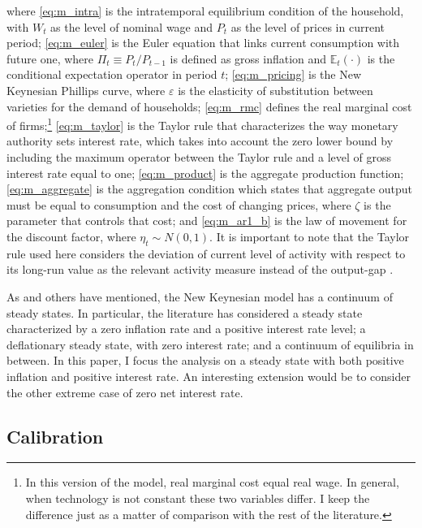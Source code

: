 \documentclass[12pt]{article}
\numberwithin{equation}{section}
\begin{document}
where \eqref{eq:m_intra} is the intratemporal equilibrium condition of the household, with $W_t$ as the level of nominal wage and $P_t$ as the level of prices in current period; \eqref{eq:m_euler} is the Euler equation that links current consumption with future one, where $\Pi_t\equiv P_t/P_{t-1}$ is defined as gross inflation and $\mathbb{E}_t(\cdot)$ is the conditional expectation operator in period $t$; \eqref{eq:m_pricing} is the New Keynesian Phillips curve, where $\varepsilon$ is the elasticity of substitution between varieties for the demand of households; \eqref{eq:m_rmc} defines the real marginal cost of firms;\footnote{In this version of the model, real marginal cost equal real wage. In general, when technology is not constant these two variables differ. I keep the difference just as a matter of comparison with the rest of the literature.} \eqref{eq:m_taylor} is the Taylor rule that characterizes the way monetary authority sets interest rate, which takes into account the zero lower bound by including the maximum operator between the Taylor rule and a level of gross interest rate equal to one; \eqref{eq:m_product} is the aggregate production function; \eqref{eq:m_aggregate} is the aggregation condition which states that aggregate output must be equal to consumption and the cost of changing prices, where $\zeta$ is the parameter that controls that cost; and \eqref{eq:m_ar1_b} is the law of movement for the discount factor, where $\eta_t\sim N(0,1)$. It is important to note that the Taylor rule used here considers the deviation of current level of activity with respect to its long-run value as the relevant activity measure instead of the output-gap \citep{Gali2015}.

As \cite{BenhabibEtAl2001a} and others have mentioned, the New Keynesian model has a continuum of steady states. In particular, the literature has considered a steady state characterized by a zero inflation rate and a positive interest rate level; a deflationary steady state, with zero interest rate; and a continuum of equilibria in between. In this paper, I focus the analysis on a steady state with both positive inflation and positive interest rate. An interesting extension would be to consider the other extreme case of zero net interest rate.

\subsection{Calibration}
\end{document}
